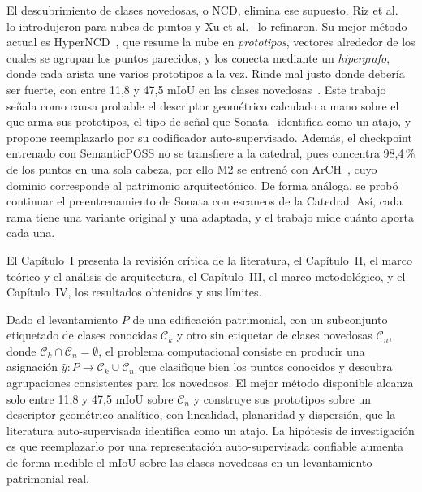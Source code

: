 El descubrimiento de clases novedosas, o NCD, elimina ese supuesto. Riz et
al.~\cite{riz2023nops} lo introdujeron para nubes de puntos y Xu et
al.~\cite{xu2024dasl} lo refinaron. Su mejor método actual es
HyperNCD~\cite{zhang2026hyperncd}, que resume la nube en \emph{prototipos},
vectores alrededor de los cuales se agrupan los puntos parecidos, y los conecta
mediante un \emph{hipergrafo}, donde cada arista une varios prototipos a la vez.
Rinde mal justo donde debería ser fuerte, con entre 11,8 y 47,5 mIoU en las
clases novedosas~\cite{zhang2026hyperncd}. Este trabajo señala como causa
probable el descriptor geométrico calculado a mano sobre el que arma sus
prototipos, el tipo de señal que Sonata~\cite{wu2025sonata} identifica
como un atajo, y propone reemplazarlo por su codificador auto-supervisado.
Además, el checkpoint entrenado con SemanticPOSS no se transfiere a la
catedral, pues concentra 98,4\,\% de los puntos en una sola cabeza, por ello M2
se entrenó con ArCH~\cite{matrone2020benchmark}, cuyo dominio corresponde al
patrimonio arquitectónico. De forma análoga, se probó continuar el
preentrenamiento de Sonata con escaneos de la Catedral. Así, cada rama tiene una
variante original y una adaptada, y el trabajo mide cuánto aporta cada una.

El Capítulo~I presenta la revisión crítica de la literatura, el Capítulo~II, el
marco teórico y el análisis de arquitectura, el Capítulo~III, el marco
metodológico, y el Capítulo~IV, los resultados obtenidos y sus límites.


Dado el levantamiento $P$ de una edificación patrimonial, con un subconjunto
etiquetado de clases conocidas $\mathcal{C}_k$ y otro sin etiquetar de clases
novedosas $\mathcal{C}_n$, donde $\mathcal{C}_k\cap\mathcal{C}_n=\emptyset$, el problema computacional consiste en producir una asignación
$\hat{y}:P\rightarrow\mathcal{C}_k\cup\mathcal{C}_n$ que clasifique bien los
puntos conocidos y descubra agrupaciones consistentes para los novedosos. El mejor método disponible
alcanza solo entre 11,8 y 47,5 mIoU sobre $\mathcal{C}_n$ y construye sus
prototipos sobre un descriptor geométrico analítico, con linealidad, planaridad y
dispersión, que la literatura auto-supervisada identifica como un atajo. La
hipótesis de investigación es que reemplazarlo por una representación
auto-supervisada confiable aumenta de forma medible el mIoU sobre las clases
novedosas en un levantamiento patrimonial real.


